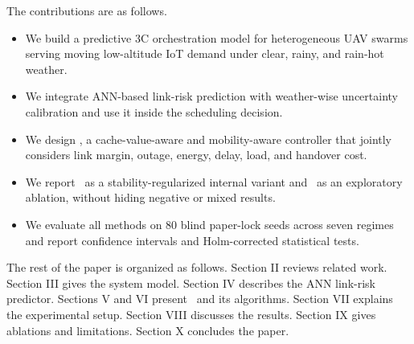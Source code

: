 The contributions are as follows.
\begin{itemize}
    \item We build a predictive 3C orchestration model for heterogeneous UAV swarms serving moving low-altitude IoT demand under clear, rainy, and rain-hot weather.
    \item We integrate ANN-based link-risk prediction with weather-wise uncertainty calibration and use it inside the scheduling decision.
    \item We design \pclr, a cache-value-aware and mobility-aware controller that jointly considers link margin, outage, energy, delay, load, and handover cost.
    \item We report \psr\ as a stability-regularized internal variant and \etp\ as an exploratory ablation, without hiding negative or mixed results.
    \item We evaluate all methods on 80 blind paper-lock seeds across seven regimes and report confidence intervals and Holm-corrected statistical tests.
\end{itemize}

The rest of the paper is organized as follows. Section II reviews related work. Section III gives the system model. Section IV describes the ANN link-risk predictor. Sections V and VI present \pchorch\ and its algorithms. Section VII explains the experimental setup. Section VIII discusses the results. Section IX gives ablations and limitations. Section X concludes the paper.
